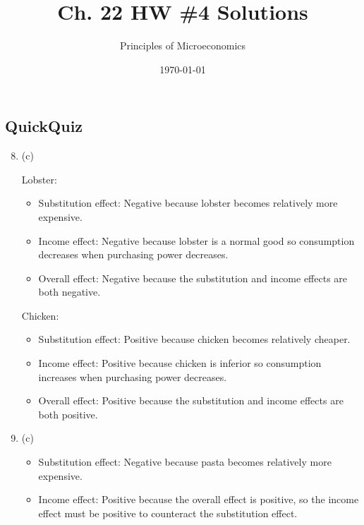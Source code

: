 \documentclass{article}
\title{Ch. 22 HW \#4 Solutions}
\author{Principles of Microeconomics}
\date{\today}
\begin{document}
\maketitle

\subsection*{QuickQuiz}

\begin{enumerate}
\setcounter{enumi}{7}

\item (c)

Lobster:

	\begin{itemize}
	
	\item Substitution effect: Negative because lobster becomes relatively more expensive.
	
	\item Income effect: Negative because lobster is a normal good so consumption decreases when purchasing power decreases.
	
	\item Overall effect: Negative because the substitution and income effects are both negative.
	
	\end{itemize}
	
Chicken:

	\begin{itemize}
	
	\item Substitution effect: Positive because chicken becomes relatively cheaper.
	
	\item Income effect: Positive because chicken is inferior so consumption increases when purchasing power decreases.
	
	\item Overall effect: Positive because the substitution and income effects are both positive.
	
	\end{itemize}

\item (c)

	\begin{itemize}
	
	\item Substitution effect: Negative because pasta becomes relatively more expensive.
	
	\item Income effect: Positive because the overall effect is positive, so the income effect must be positive to counteract the substitution effect.
	

\end{itemize}
\end{enumerate}
\end{document}
